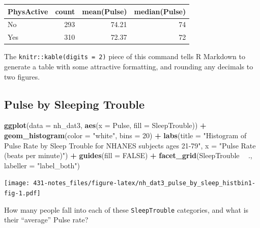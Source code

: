 \documentclass[
]{book}
\newenvironment{Shaded}{\begin{snugshade}}{\end{snugshade}}
\newcommand{\DataTypeTok}[1]{\textcolor[rgb]{0.13,0.29,0.53}{#1}}
\newcommand{\DecValTok}[1]{\textcolor[rgb]{0.00,0.00,0.81}{#1}}
\newcommand{\KeywordTok}[1]{\textcolor[rgb]{0.13,0.29,0.53}{\textbf{#1}}}
\newcommand{\NormalTok}[1]{#1}
\newcommand{\OperatorTok}[1]{\textcolor[rgb]{0.81,0.36,0.00}{\textbf{#1}}}
\newcommand{\OtherTok}[1]{\textcolor[rgb]{0.56,0.35,0.01}{#1}}
\newcommand{\StringTok}[1]{\textcolor[rgb]{0.31,0.60,0.02}{#1}}
\begin{document}
\begin{tabular}{l|r|r|r}
\hline
PhysActive & count & mean(Pulse) & median(Pulse)\\
\hline
No & 293 & 74.21 & 74\\
\hline
Yes & 310 & 72.37 & 72\\
\hline
\end{tabular}

The \texttt{knitr::kable(digits\ =\ 2)} piece of this command tells R Markdown to generate a table with some attractive formatting, and rounding any decimals to two figures.

\hypertarget{pulse-by-sleeping-trouble}{%
\subsection{Pulse by Sleeping Trouble}\label{pulse-by-sleeping-trouble}}

\begin{Shaded}
\begin{Highlighting}[]
\KeywordTok{ggplot}\NormalTok{(}\DataTypeTok{data =}\NormalTok{ nh_dat3, }\KeywordTok{aes}\NormalTok{(}\DataTypeTok{x =}\NormalTok{ Pulse, }\DataTypeTok{fill =}\NormalTok{ SleepTrouble)) }\OperatorTok{+}\StringTok{ }
\StringTok{    }\KeywordTok{geom_histogram}\NormalTok{(}\DataTypeTok{color =} \StringTok{"white"}\NormalTok{, }\DataTypeTok{bins =} \DecValTok{20}\NormalTok{) }\OperatorTok{+}\StringTok{ }
\StringTok{    }\KeywordTok{labs}\NormalTok{(}\DataTypeTok{title =} \StringTok{"Histogram of Pulse Rate by Sleep Trouble for NHANES subjects ages 21-79"}\NormalTok{,}
         \DataTypeTok{x =} \StringTok{"Pulse Rate (beats per minute)"}\NormalTok{) }\OperatorTok{+}\StringTok{ }
\StringTok{    }\KeywordTok{guides}\NormalTok{(}\DataTypeTok{fill =} \OtherTok{FALSE}\NormalTok{) }\OperatorTok{+}
\StringTok{    }\KeywordTok{facet_grid}\NormalTok{(SleepTrouble }\OperatorTok{~}\StringTok{ }\NormalTok{., }\DataTypeTok{labeller =} \StringTok{"label_both"}\NormalTok{)}
\end{Highlighting}
\end{Shaded}

\texttt{[image: 431-notes\_files/figure-latex/nh\_dat3\_pulse\_by\_sleep\_histbin1-fig-1.pdf]}

How many people fall into each of these \texttt{SleepTrouble} categories, and what is their ``average'' Pulse rate?

\begin{Shaded}
\end{Shaded}
\end{document}
